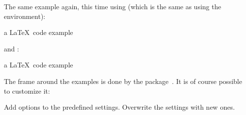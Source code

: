 \documentclass[load-preamble+,babel-options={ngerman,english}]{cnltx-doc}
\begin{document}
The same example again, this time using   (which is the
same as using the  environment):

\begin{example}
  a \LaTeX\ code example
\end{example}

 and :

\begin{example}[side-by-side,code-left=false]
  a \LaTeX\ code example
\end{example}

The frame around the examples is done by the
 package~\cite{pkg:mdframed}.  It is of course possible to
customize it:
\begin{options}
  \Default
    Add options to the predefined settings.
    Overwrite the settings with new ones.
\end{options}
\end{document}
